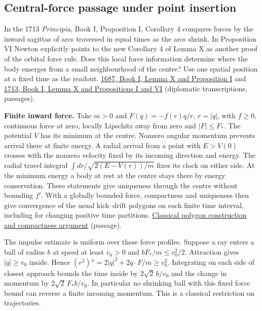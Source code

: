 \documentclass[11pt,a4paper]{article}
\begin{document}
\subsection{Central-force passage under point
insertion}\label{central-force-passage-under-point-insertion}

In the 1713 \emph{Principia}, Book I, Proposition I, Corollary 4
compares forces by the inward sagittas of arcs traversed in equal times
as the arcs shrink. In Proposition VI Newton explicitly points to the
new Corollary 4 of Lemma X as another proof of the orbital force rule.
Does this local force information determine where the body emerges from
a small neighbourhood of the centre? Use one spatial position at a fixed
time as the readout.
\href{https://www.newtonproject.ox.ac.uk/view/texts/diplomatic/NATP00077}{1687,
Book I, Lemma X and Proposition I} and
\href{https://www.newtonproject.ox.ac.uk/view/texts/diplomatic/NATP00082}{1713,
Book I, Lemma X and Propositions I and VI} (diplomatic transcriptions,
passages).

\textbf{Finite inward force.} Take \(m>0\) and \(F(q)=-f(r)q/r\),
\(r=|q|\), with \(f\ge0\), continuous force at zero, locally Lipschitz
away from zero and \(|F|\le F_*\). The potential \(V\) has its minimum
at the centre. Nonzero angular momentum prevents arrival there at finite
energy. A radial arrival from a point with \(E>V(0)\) crosses with the
nonzero velocity fixed by its incoming direction and energy. The radial
travel integral \(\int dr/\sqrt{2(E-V(r))/m}\) fixes its clock on either
side. At the minimum energy a body at rest at the centre stays there by
energy conservation. These statements give uniqueness through the centre
without bounding \(f'\). With a globally bounded force, compactness and
uniqueness then give convergence of the usual kick--drift polygons on
each finite time interval, including for changing positive time
partitions. \href{balaban-ode-lesson.md}{Classical polygon construction
and compactness argument} (passage).

The impulse estimate is uniform over these force profiles. Suppose a ray
enters a ball of radius \(b\) at speed at least \(v_0>0\) and
\(bF_*/m\le v_0^2/2\). Attraction gives \(|\dot q|\ge v_0\) inside.
Hence \((r^2)''=2|\dot q|^2+2q\cdot F/m\ge v_0^2\). Integrating on each
side of closest approach bounds the time inside by \(2\sqrt2\,b/v_0\)
and the change in momentum by \(2\sqrt2\,F_*b/v_0\). In particular no
shrinking ball with this fixed force bound can reverse a finite incoming
momentum. This is a classical restriction on trajectories.
\end{document}
